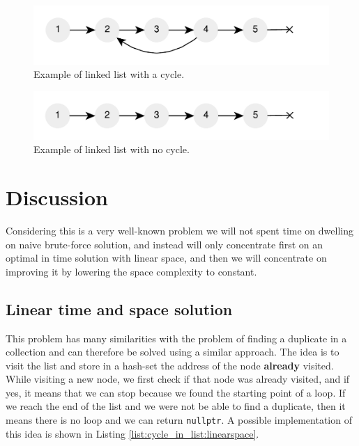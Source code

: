 \begin{figure}
	\centering
	\includegraphics[scale=1.0]{sources/cycle_in_list/images/list_cycle}
	\caption{Example of linked list with a cycle.}
	\label{fig:cycle_in_list:example1}
\end{figure}
\begin{figure}
	\label{fig:cycle_in_list:example2}
	\centering
	\includegraphics[scale=1.0]{sources/cycle_in_list/images/list_no_cycle}
	\caption{Example of linked list with no cycle.}
\end{figure}

%
%

\section{Discussion}
\label{cycle_in_list:sec:discussion}
Considering this is a very well-known problem we will not spent time on dwelling on naive
brute-force solution, and instead will only concentrate first on an optimal in time solution with
linear space, and then we will concentrate on improving it by lowering the space complexity to
constant.

\subsection{Linear time and space solution}
\label{cycle_in_list:sec:bruteforce}
This problem has many similarities with the problem of finding a duplicate in a collection and can
therefore be solved using a similar approach. The idea is to visit the list and store in a hash-set
the  address of the node \textbf{already} visited. While visiting a new node, we first check if that
node was already visited, and if yes, it means that we can stop because we found the starting point
of a loop. If we reach the end of the list and we were not be able to find a duplicate, then it
means there is no loop and we can return \lstinline[columns=fixed]{nullptr}. A possible
implementation of this idea is shown in Listing \ref{list:cycle_in_list:linearspace}.

